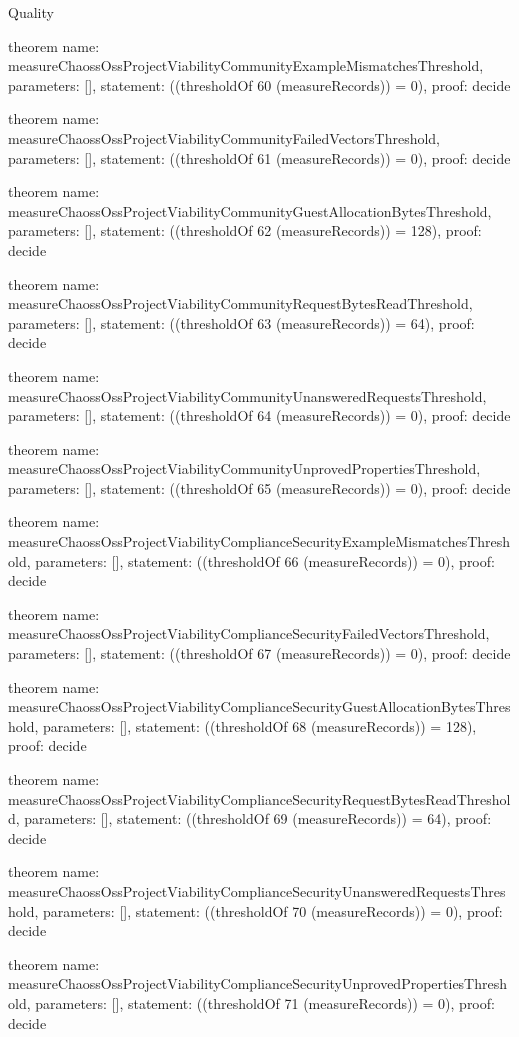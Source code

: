 \begin{lexlean}{Quality}
\begin{semanticmodule}
theorem{
  name: measureChaossOssProjectViabilityCommunityExampleMismatchesThreshold,
  parameters: [],
  statement: ((thresholdOf 60 (measureRecords)) = 0),
  proof: decide{}
}

theorem{
  name: measureChaossOssProjectViabilityCommunityFailedVectorsThreshold,
  parameters: [],
  statement: ((thresholdOf 61 (measureRecords)) = 0),
  proof: decide{}
}

theorem{
  name: measureChaossOssProjectViabilityCommunityGuestAllocationBytesThreshold,
  parameters: [],
  statement: ((thresholdOf 62 (measureRecords)) = 128),
  proof: decide{}
}

theorem{
  name: measureChaossOssProjectViabilityCommunityRequestBytesReadThreshold,
  parameters: [],
  statement: ((thresholdOf 63 (measureRecords)) = 64),
  proof: decide{}
}

theorem{
  name: measureChaossOssProjectViabilityCommunityUnansweredRequestsThreshold,
  parameters: [],
  statement: ((thresholdOf 64 (measureRecords)) = 0),
  proof: decide{}
}

theorem{
  name: measureChaossOssProjectViabilityCommunityUnprovedPropertiesThreshold,
  parameters: [],
  statement: ((thresholdOf 65 (measureRecords)) = 0),
  proof: decide{}
}

theorem{
  name: measureChaossOssProjectViabilityComplianceSecurityExampleMismatchesThreshold,
  parameters: [],
  statement: ((thresholdOf 66 (measureRecords)) = 0),
  proof: decide{}
}

theorem{
  name: measureChaossOssProjectViabilityComplianceSecurityFailedVectorsThreshold,
  parameters: [],
  statement: ((thresholdOf 67 (measureRecords)) = 0),
  proof: decide{}
}

theorem{
  name: measureChaossOssProjectViabilityComplianceSecurityGuestAllocationBytesThreshold,
  parameters: [],
  statement: ((thresholdOf 68 (measureRecords)) = 128),
  proof: decide{}
}

theorem{
  name: measureChaossOssProjectViabilityComplianceSecurityRequestBytesReadThreshold,
  parameters: [],
  statement: ((thresholdOf 69 (measureRecords)) = 64),
  proof: decide{}
}

theorem{
  name: measureChaossOssProjectViabilityComplianceSecurityUnansweredRequestsThreshold,
  parameters: [],
  statement: ((thresholdOf 70 (measureRecords)) = 0),
  proof: decide{}
}

theorem{
  name: measureChaossOssProjectViabilityComplianceSecurityUnprovedPropertiesThreshold,
  parameters: [],
  statement: ((thresholdOf 71 (measureRecords)) = 0),
  proof: decide{}
}


\end{semanticmodule}
\end{lexlean}
